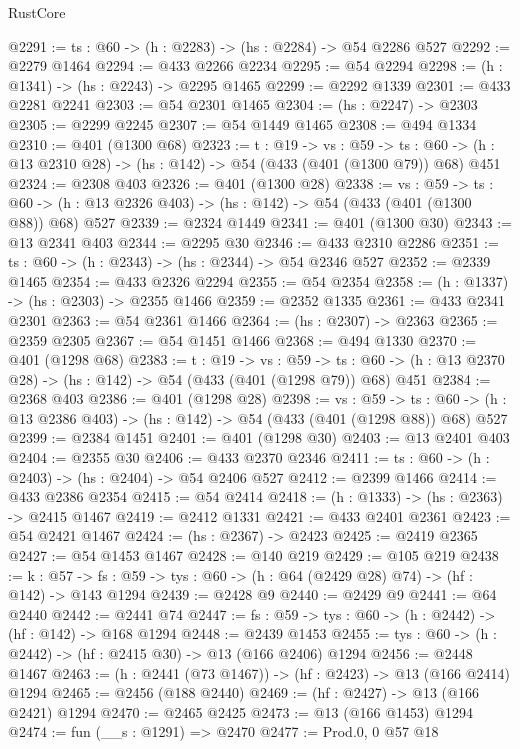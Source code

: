 \begin{lexlean}{RustCore}
\begin{coremodule}
@2291 := {ts : @60} -> (h : @2283) -> (hs : @2284) -> @54 @2286 @527
@2292 := @2279 @1464
@2294 := @433 @2266 @2234
@2295 := @54 @2294
@2298 := (h : @1341) -> (hs : @2243) -> @2295 @1465
@2299 := @2292 @1339
@2301 := @433 @2281 @2241
@2303 := @54 @2301 @1465
@2304 := (hs : @2247) -> @2303
@2305 := @2299 @2245
@2307 := @54 @1449 @1465
@2308 := @494 @1334
@2310 := @401 (@1300 @68)
@2323 := {t : @19} ->
  {vs : @59} ->
  {ts : @60} -> (h : @13 @2310 @28) -> (hs : @142) -> @54 (@433 (@401 (@1300 @79)) @68) @451
@2324 := @2308 @403
@2326 := @401 (@1300 @28)
@2338 := {vs : @59} ->
  {ts : @60} -> (h : @13 @2326 @403) -> (hs : @142) -> @54 (@433 (@401 (@1300 @88)) @68) @527
@2339 := @2324 @1449
@2341 := @401 (@1300 @30)
@2343 := @13 @2341 @403
@2344 := @2295 @30
@2346 := @433 @2310 @2286
@2351 := {ts : @60} -> (h : @2343) -> (hs : @2344) -> @54 @2346 @527
@2352 := @2339 @1465
@2354 := @433 @2326 @2294
@2355 := @54 @2354
@2358 := (h : @1337) -> (hs : @2303) -> @2355 @1466
@2359 := @2352 @1335
@2361 := @433 @2341 @2301
@2363 := @54 @2361 @1466
@2364 := (hs : @2307) -> @2363
@2365 := @2359 @2305
@2367 := @54 @1451 @1466
@2368 := @494 @1330
@2370 := @401 (@1298 @68)
@2383 := {t : @19} ->
  {vs : @59} ->
  {ts : @60} -> (h : @13 @2370 @28) -> (hs : @142) -> @54 (@433 (@401 (@1298 @79)) @68) @451
@2384 := @2368 @403
@2386 := @401 (@1298 @28)
@2398 := {vs : @59} ->
  {ts : @60} -> (h : @13 @2386 @403) -> (hs : @142) -> @54 (@433 (@401 (@1298 @88)) @68) @527
@2399 := @2384 @1451
@2401 := @401 (@1298 @30)
@2403 := @13 @2401 @403
@2404 := @2355 @30
@2406 := @433 @2370 @2346
@2411 := {ts : @60} -> (h : @2403) -> (hs : @2404) -> @54 @2406 @527
@2412 := @2399 @1466
@2414 := @433 @2386 @2354
@2415 := @54 @2414
@2418 := (h : @1333) -> (hs : @2363) -> @2415 @1467
@2419 := @2412 @1331
@2421 := @433 @2401 @2361
@2423 := @54 @2421 @1467
@2424 := (hs : @2367) -> @2423
@2425 := @2419 @2365
@2427 := @54 @1453 @1467
@2428 := @140 @219
@2429 := @105 @219
@2438 := {k : @57} ->
  {fs : @59} -> {tys : @60} -> (h : @64 (@2429 @28) @74) -> (hf : @142) -> @143 @1294
@2439 := @2428 @9
@2440 := @2429 @9
@2441 := @64 @2440
@2442 := @2441 @74
@2447 := {fs : @59} -> {tys : @60} -> (h : @2442) -> (hf : @142) -> @168 @1294
@2448 := @2439 @1453
@2455 := {tys : @60} -> (h : @2442) -> (hf : @2415 @30) -> @13 (@166 @2406) @1294
@2456 := @2448 @1467
@2463 := (h : @2441 (@73 @1467)) -> (hf : @2423) -> @13 (@166 @2414) @1294
@2465 := @2456 (@188 @2440)
@2469 := (hf : @2427) -> @13 (@166 @2421) @1294
@2470 := @2465 @2425
@2473 := @13 (@166 @1453) @1294
@2474 := fun (__s : @1291) => @2470
@2477 := Prod.{0, 0} @57 @18

\end{coremodule}
\end{lexlean}
